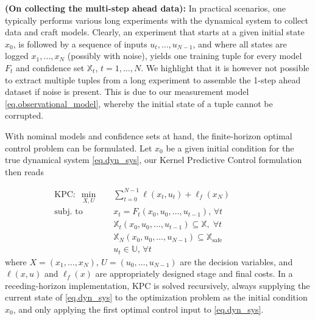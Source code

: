 \begin{remark}
	\textbf{(On collecting the multi-step ahead data):}
	In practical scenarios, one typically performs various long experiments with the dynamical system to collect data and craft models. Clearly, an experiment that starts at a given initial state $x_0$, is followed by a sequence of inputs $u_t,\dots,u_{N-1}$, and where all states are logged $x_1,\dots,x_{N}$ (possibly with noise), yields one training tuple for every model $F_t$ and confidence set $\mathbb{X}_t$, $t=1,\dots,N$. We highlight that it is however not possible to extract multiple tuples from a long experiment to assemble the 1-step ahead dataset if noise is present. This is due to our measurement model \eqref{eq.observational_model}, whereby the initial state of a tuple cannot be corrupted.
\end{remark}

With nominal models and confidence sets at hand, the finite-horizon optimal control problem can be formulated. Let $x_0$ be a given initial condition for the true dynamical system \eqref{eq.dyn_sys}, our Kernel Predictive Control formulation then reads

\begin{subequations}
	\begin{align}
		\text{KPC}: \; \min_{X,U} & \quad \sum_{t=0}^{N-1} \ell (x_t,u_t) + \ell_f (x_N) \\
		\text{subj. to} & \quad x_{t} = F_{t}(x_0,u_0,\dots,u_{t-1}), \, \forall t \label{eq.KPCnominal} \\
		& \quad \mathbb{X}_t(x_0,u_0,\dots,u_{t-1}) \subseteq \mathbb{X}, \; \forall t \hspace{2cm} \label{eq.setContrs1} \\
		& \quad \mathbb{X}_N(x_0,u_0,\dots,u_{N-1}) \subseteq \mathbb{X}_{\text{safe}} \label{eq.setContrs2} \\
		& \quad u_t \in \mathbb{U}, \, \forall t 
	\end{align}
	\label{eq.KPC}%
\end{subequations}
where $X = (x_1,\dots,x_N)$, $U = (u_0,\dots,u_{N-1})$ are the decision variables, and $\ell(x,u)$ and $\ell_f(x)$ are appropriately designed stage and final costs. In a receding-horizon implementation, KPC is solved recursively, always supplying the current state of \eqref{eq.dyn_sys} to the optimization problem as the initial condition $x_0$, and only applying the first optimal control input to \eqref{eq.dyn_sys}.

